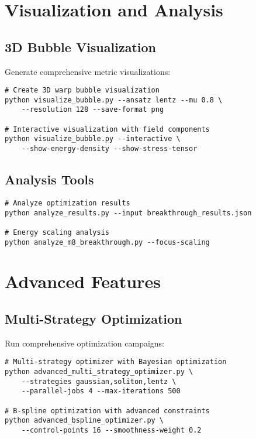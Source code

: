\documentclass{article}
\begin{document}
\section{Visualization and Analysis}

\subsection{3D Bubble Visualization}

Generate comprehensive metric visualizations:

\begin{lstlisting}
# Create 3D warp bubble visualization
python visualize_bubble.py --ansatz lentz --mu 0.8 \
    --resolution 128 --save-format png

# Interactive visualization with field components
python visualize_bubble.py --interactive \
    --show-energy-density --show-stress-tensor
\end{lstlisting}

\subsection{Analysis Tools}

\begin{lstlisting}
# Analyze optimization results
python analyze_results.py --input breakthrough_results.json

# Energy scaling analysis
python analyze_m8_breakthrough.py --focus-scaling
\end{lstlisting}

\section{Advanced Features}

\subsection{Multi-Strategy Optimization}

Run comprehensive optimization campaigns:

\begin{lstlisting}
# Multi-strategy optimizer with Bayesian optimization
python advanced_multi_strategy_optimizer.py \
    --strategies gaussian,soliton,lentz \
    --parallel-jobs 4 --max-iterations 500

# B-spline optimization with advanced constraints
python advanced_bspline_optimizer.py \
    --control-points 16 --smoothness-weight 0.2
\end{lstlisting}
\end{document}
